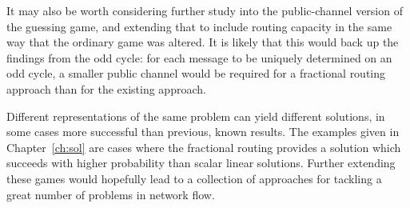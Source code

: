 It may also be worth considering further study into the public-channel version of the guessing game, and extending that to include routing capacity in the same way that the ordinary game was altered. It is likely that this would back up the findings from the odd cycle: for each message to be uniquely determined on an odd cycle, a smaller public channel would be required for a fractional routing approach than for the existing approach.

Different representations of the same problem can yield different solutions, in some cases more successful than previous, known results. The examples given in Chapter~\ref{ch:sol} are cases where the fractional routing provides a solution which succeeds with higher probability than scalar linear solutions. Further extending these games would hopefully lead to a collection of approaches for tackling a great number of problems in network flow.